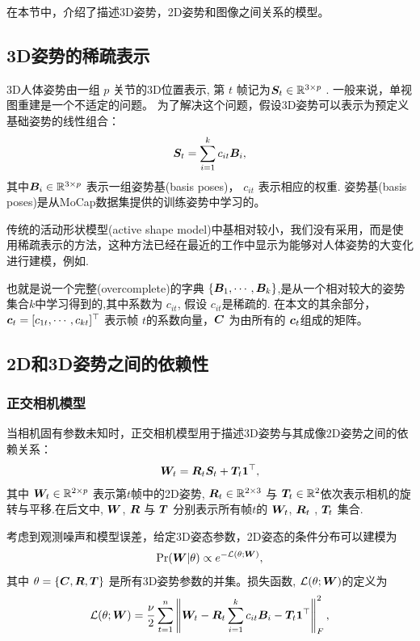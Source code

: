 在本节中，介绍了描述3D姿势，2D姿势和图像之间关系的模型。
\subsection{3D姿势的稀疏表示}
3D人体姿势由一组 $p$ 关节的3D位置表示, 第 $t$ 帧记为${\bm{S}}_t\in\mathbb{R}^{3 \times p}$ .
一般来说，单视图重建是一个不适定的问题。 为了解决这个问题，假设3D姿势可以表示为预定义基础姿势的线性组合：
\begin{align}\label{eq:shape-model}
    {\bm{S}}_t = \sum_{i=1}^{k} c_{it}{\bm{B}}_i,
\end{align}
其中${\bm{B}}_i\in\mathbb{R}^{3 \times p}$ 表示一组姿势基(basis poses)， $c_{it}$ 表示相应的权重. 姿势基(basis poses)是从MoCap数据集提供的训练姿势中学习的。

传统的活动形状模型(active shape model)\cite{cootes1995}中基相对较小，我们没有采用，而是使用稀疏表示的方法，这种方法已经在最近的工作中显示为能够对人体姿势的大变化进行建模，例如\cite{ramakrishna2012reconstructing,akhter2015pose,zhou2015sparse}.

也就是说一个完整(overcomplete)的字典 $\{{\bm{B}}_1,\cdots,{\bm{B}}_k\}$,是从一个相对较大的姿势集合$k$中学习得到的,其中系数为 $c_{it}$, 假设 $c_{it}$是稀疏的. 在本文的其余部分，${\bm{c}}_t = [c_{1t},\cdots,c_{kt}]^\top$ 表示帧 $t$的系数向量，${\bm{C}}$ 为由所有的 ${\bm{c}}_{t}$组成的矩阵。


\subsection{2D和3D姿势之间的依赖性}

\subsubsection{正交相机模型}

当相机固有参数未知时，正交相机模型用于描述3D姿势与其成像2D姿势之间的依赖关系：
\begin{align}\label{eq:camera-model}
    {\bm{W}}_t = {\bm{R}}_t{\bm{S}}_t + {\bm{T}}_t{\bm{1}}^\top,
\end{align}
其中 ${\bm{W}}_t\in\mathbb{R}^{2 \times p}$ 表示第$t$帧中的2D姿势, ${\bm{R}}_t\in\mathbb{R}^{2 \times 3}$ 与 ${\bm{T}}_t\in\mathbb{R}^{2}$依次表示相机的旋转与平移.在后文中, ${\bm{W}}$, ${\bm{R}}$ 与 ${\bm{T}}$ 分别表示所有帧$t$的 ${\bm{W}}_t$, ${\bm{R}}_t$ , ${\bm{T}}_t$ 集合.

考虑到观测噪声和模型误差，给定3D姿态参数，2D姿态的条件分布可以建模为
\begin{align}\label{eq:likelihood}
\mbox{Pr}({\bm{W}}|\theta) \propto e^{-\mathcal{L}(\theta;{\bm{W}})},
\end{align}
其中 $\theta=\{{\bm{C}},{\bm{R}},{\bm{T}}\}$ 是所有3D姿势参数的并集。损失函数, $\mathcal{L}(\theta;{\bm{W}})$的定义为
\begin{align}\label{eq:loss}
\mathcal{L}(\theta;{\bm{W}}) = \frac{\nu}{2}\sum_{t=1}^{n}\left\|{\bm{W}}_t - {\bm{R}}_t\sum_{i=1}^{k} c_{it}{\bm{B}}_i - {\bm{T}}_t{\bm{1}}^\top\right\|_F^2,
\end{align}

